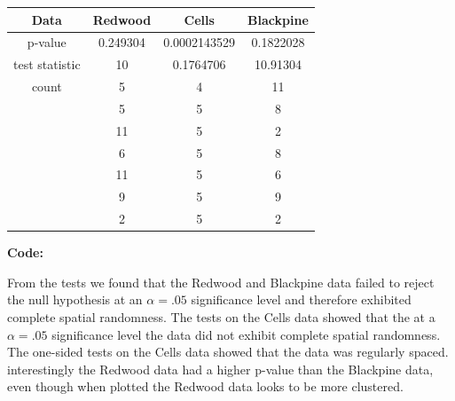 \documentclass[12pt]{article}
\makeatletter
\theoremstyle{homework}
\newenvironment{exercise}[1]
{\def\@currentlabel{#1}\exercisecore}
{\endexercisecore}
\makeatother
\begin{document}
\begin{exercise}{4}
  \begin{center}
    \begin{tabular}{c|| c c c}
        Data & Redwood & Cells & Blackpine\\
      \hline 
      p-value        &  0.249304 & 0.0002143529   &  0.1822028\\
      test statistic &  10     & 0.1764706   & 10.91304\\
      count          &  5      &  4          & 11\\
                     &  5      &  5          &  8\\
                     & 11      &  5          &  2\\
                     &  6      &  5          &  8\\
                     & 11      &  5          &  6\\
                     &  9      &  5          &  9\\
                     &  2      &  5          &  2\\                                                                                          
     \end{tabular}
    \end{center}
    \textbf{Code:}
    \begin{center}
    
    \end{center}

    From the tests we found that the Redwood and Blackpine data failed to reject the null hypothesis at an $\alpha = .05$ significance level and therefore exhibited complete spatial randomness. 
    The tests on the Cells data showed that the at a $\alpha = .05$ significance level the data did not exhibit complete spatial randomness. The one-sided tests on the Cells data showed that 
    the data was regularly spaced. interestingly the Redwood data had a higher p-value than the Blackpine data, even though when plotted the Redwood data looks to be more clustered. 




\end{exercise}

\vspace{.5in}
\end{document}
